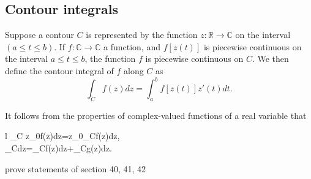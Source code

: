 \documentclass{article}
\begin{document}
\subsection{Contour integrals}
Suppose a contour \(C\) is represented by the function \(z:\mathbb{R}\rightarrow\mathbb{C}\) on the interval \((a\leq t\leq b)\). If \(f:\mathbb{C}\rightarrow\mathbb{C}\) a function, and \(f[z(t)]\) is piecewise continuous on the interval \(a\leq t\leq b\), the function \(f\) is piecewise continuous on \(C\). We then define the contour integral of \(f\) along \(C\) as
\begin{equation*}
	\int_{C}f(z)dz=\int_a^b f[z(t)]z'(t)dt.
\end{equation*}
\begin{proposition}
	It follows from the properties of complex-valued functions of a real variable that
	\begin{IEEEeqnarray*}{l}
		\int_C z_0f(z)dz=z_0\int_Cf(z)dz,\\
		\int_C\big[f(z)+g(z)\big]dz=\int_Cf(z)dz+\int_Cg(z)dz.
	\end{IEEEeqnarray*}
\end{proposition}
\begin{remark}
	prove statements of section 40, 41, 42
\end{remark}
\end{document}
